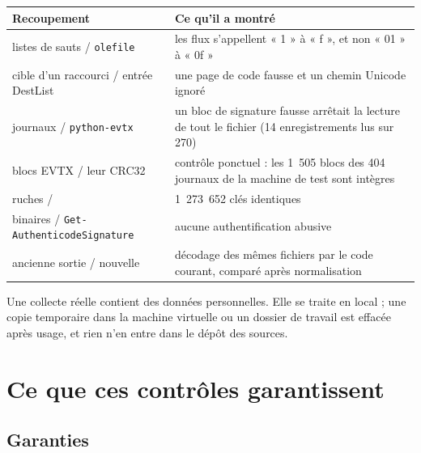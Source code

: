\documentclass[11pt,a4paper,oneside]{report}
\begin{document}
\begin{longtable}{@{}L{5.4cm}L{9.6cm}@{}}
\toprule
\textbf{Recoupement} & \textbf{Ce qu'il a montré} \\
\midrule
\endhead
listes de sauts / \texttt{olefile} & les flux s'appellent « 1 » à « f »,
  et non « 01 » à « 0f » \\
cible d'un raccourci / entrée DestList & une page de code fausse et un chemin
  Unicode ignoré \\
journaux / \texttt{python-evtx} & un bloc de signature fausse arrêtait la
  lecture de tout le fichier (14 enregistrements lus sur 270) \\
blocs EVTX / leur CRC32 & contrôle ponctuel : les 1~505 blocs des 404
  journaux de la machine de test sont intègres \\
ruches /  & 1~273~652 clés identiques \\
binaires / \texttt{Get-AuthenticodeSignature} & aucune authentification
  abusive \\
ancienne sortie / nouvelle & décodage des mêmes fichiers par le code courant,
  comparé après normalisation \\
\bottomrule
\end{longtable}

\begin{note}
Une collecte réelle contient des données personnelles. Elle se traite en local ;
une copie temporaire dans la machine virtuelle ou un dossier de travail est
effacée après usage, et rien n'en entre dans le dépôt des sources.
\end{note}

\chapter{Ce que ces contrôles garantissent}

\section{Garanties}
\end{document}
